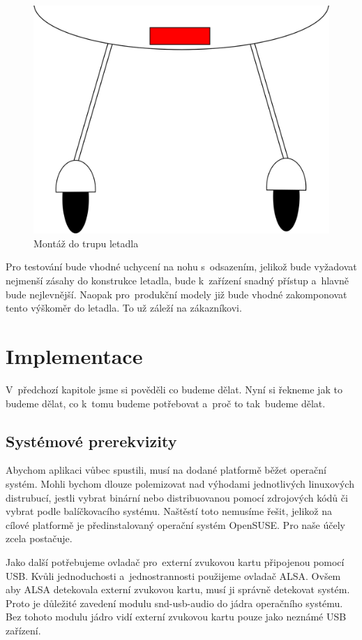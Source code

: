 \begin{itemize}
			\begin{figure}[H]
				\begin{center}
					\includegraphics[scale=0.5]{obrazky-figures/umisteni_v_trupu.png}
					\caption{Montáž do trupu letadla}
					\label{navrh::umisteniuvnitr}
				\end{center}
			\end{figure}
			
		\end{itemize} 
		
		Pro testování bude vhodné uchycení na nohu s~odsazením, jelikož bude vyžadovat nejmenší zásahy do konstrukce letadla, bude k~zařízení snadný přístup a~hlavně bude nejlevnější.
		Naopak pro~produkční modely již bude vhodné zakomponovat tento výškoměr do letadla. To už záleží na zákazníkovi.
		
\chapter{Implementace}
	V~předchozí kapitole jsme si pověděli co budeme dělat. Nyní si řekneme jak to budeme dělat, co k~tomu budeme potřebovat a~proč to tak~budeme dělat.\par
	
	\section{Systémové prerekvizity}
	Abychom aplikaci vůbec spustili, musí na dodané platformě běžet operační systém. Mohli bychom dlouze polemizovat nad výhodami jednotlivých linuxových distrubucí, jestli vybrat binární nebo distribuovanou pomocí zdrojových kódů či vybrat podle balíčkovacího systému. Naštěstí toto nemusíme řešit, jelikož na cílové platformě je předinstalovaný operační systém OpenSUSE. Pro naše účely zcela postačuje.\par
	Jako další potřebujeme ovladač pro~externí zvukovou kartu připojenou pomocí USB. Kvůli jednoduchosti a~jednostrannosti použijeme ovladač ALSA. Ovšem aby ALSA detekovala externí zvukovou kartu, musí ji správně detekovat systém. Proto je důležité zavedení modulu snd-usb-audio do jádra operačního systému. Bez tohoto modulu jádro vidí externí zvukovou kartu pouze jako neznámé USB zařízení.\par
	
